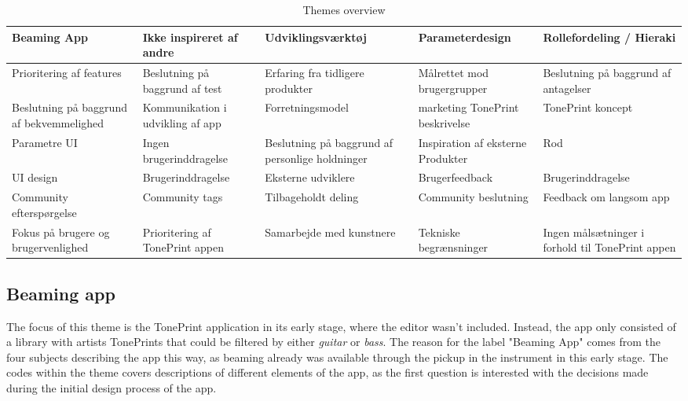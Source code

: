 \begin{table}[H]
\label{ThemesOverview}
\small
\begin{tabularx}{\textwidth}{|R|R|R|R|R|}
\hline
Beaming App & Ikke inspireret af andre & Udviklingsværktøj & Parameterdesign & Rollefordeling / Hieraki \\ \hline
Prioritering af features & Beslutning på baggrund af test & Erfaring fra tidligere produkter & Målrettet mod brugergrupper & Beslutning på baggrund af antagelser \\ \hline
Beslutning på baggrund af bekvemmelighed & Kommunikation i udvikling af app & Forretningsmodel & marketing \/ TonePrint beskrivelse & TonePrint koncept \\ \hline
 Parametre UI & Ingen brugerinddragelse & Beslutning på baggrund af personlige holdninger & Inspiration af eksterne Produkter & Rod \\ \hline
UI design & Brugerinddragelse & Eksterne udviklere & Brugerfeedback & Brugerinddragelse \\ \hline
Community efterspørgelse & Community tags & Tilbageholdt deling & Community beslutning & Feedback om langsom app \\ \hline
Fokus på brugere og brugervenlighed & Prioritering af TonePrint appen & Samarbejde med kunstnere & Tekniske begrænsninger & Ingen målsætninger i forhold til TonePrint appen \\ \hline
\end{tabularx}
\caption{Themes overview}
\end{table}


\subsection*{Beaming app}
\label{App:ThemeBeamingApp}
The focus of this theme is the TonePrint application in its early stage, where the editor wasn't included. Instead, the app only consisted of a library with artists TonePrints that could be filtered by either \textit{guitar} or \textit{bass}. The reason for the label "Beaming App" comes from the four subjects describing the app this way, as beaming already was available through the pickup in the instrument in this early stage. The codes within the theme covers descriptions of different elements of the app, as the first question is interested with the decisions made during the initial design process of the app.

